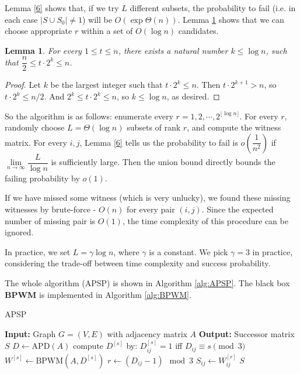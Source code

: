 \documentclass[11pt]{article}
\theoremstyle{plain}
\newtheorem{lemma}{Lemma}[section]
\begin{document}
Lemma \ref{6} shows that, if we try $L$ different subsets, the probability to fail (i.e. in each case $|S\cup S_0|\not=1$) will be $O(\exp{\Theta(n)})$. Lemma \ref{7} shows that we can choose appropriate $r$ within a set of $O(\log n)$ candidates.

\begin{lemma}
\label{7}
For every $1\le t\le n$, there exists a natural number $k\le \log n$, such that $\dfrac{n}{2}\le t\cdot 2^k\le n$.
\end{lemma}
\begin{proof}
Let $k$ be the largest integer such that $t\cdot 2^k\le n$. Then $t\cdot 2^{k+1}>n$, so $t\cdot 2^k\le n/2$. And $2^k\le t\cdot 2^k\le n$, so $k\le \log n$, as desired.
\end{proof}

So the algorithm is as follows: enumerate every $r=1,2,\cdots,2^{\lfloor\log n\rfloor}$. For every $r$, randomly choose $L=\Theta(\log n)$ subsets of rank $r$, and compute the witness matrix. For every $i,j$, Lemma \ref{6} tells us the probability to fail is $o(\dfrac{1}{n^2})$ if $\lim\limits_{n\to \infty}\dfrac{L}{\log n}$ is sufficiently large. Then the union bound directly bounds the failing probability by $o(1)$.

If we have missed some witness (which is very unlucky), we found these missing witnesses by brute-force - $O(n)$ for every pair $(i,j)$. Since the expected number of missing pair is $O(1)$, the time complexity of this procedure can be ignored.

In practice, we set $L=\gamma\log n$, where $\gamma$ is a constant. We pick $\gamma=3$ in practice, considering the trade-off between time complexity and success probability. 

The whole algorithm (APSP) is shown in Algorithm \ref{alg:APSP}. The black box \textbf{BPWM} is implemented in Algorithm \ref{alg:BPWM}.

\begin{algorithm}
    \caption{APSP}
    \label{alg:APSP}
    \begin{algorithmic}[1]
        \STATE \textbf{Input:} Graph $G=(V,E)$ with adjacency matrix $A$
        \STATE \textbf{Output:} Successor matrix $S$
        \STATE $D\leftarrow \text{APD}(A)$
            \STATE compute $D^{[s]}$ by: $D^{[s]}_{ij}=1$ iff $D_{ij}\equiv s\pmod 3$
            \STATE $W^{[s]}\leftarrow \text{BPWM}(A,D^{[s]})$
        \ENDFOR
                \STATE $r\leftarrow (D_{ij}-1)\mod 3$
                \STATE $S_{ij}\leftarrow W^{[r]}_{ij}$
            \ENDFOR
        \ENDFOR
    \RETURN $S$
    \end{algorithmic}
\end{algorithm}
\end{document}
